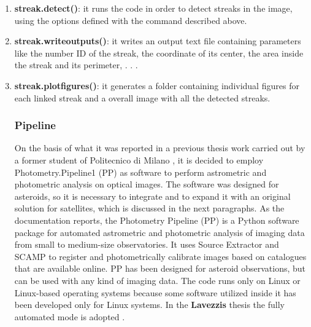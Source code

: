 \documentclass[11pt]{article}
\begin{document}
\begin{enumerate}
\begin{enumerate}
value of these distances). For a circle, that value is zero.
\item \textbf{connectivity\textunderscore angle}: the maximum angle of slope to link each streak; if
two or more streaks have their slopes within the \textbf{connectivity\textunderscore angle} and
also the slope between the centers of the streaks is within it, \textbf{ASTRiDE}
determines that these streaks are connected.
\item \textbf{output\textunderscore path}: output path to save figures and outputs.
\end{enumerate}{}
\item \textbf{streak.detect()}: it runs the code in order to detect streaks in the image,
using the options defined with the command described above.
\item \textbf{streak.write\textunderscore outputs()}: it writes an output text file containing parameters
like the number ID of the streak, the coordinate of its center, the area
inside the streak and its perimeter, . . .
\item \textbf{streak.plot\textunderscore figures()}: it generates a folder containing individual figures
for each linked streak  and a overall image with all the detected
streaks.
\subsubsection{Pipeline}
On the basis of what it was reported in a previous thesis  work carried out by a
former student of Politecnico di Milano , it is decided to employ Photometry.Pipeline1 (PP) as software to perform astrometric and photometric analysis on
optical images. The software was designed for asteroids, so it is necessary to
integrate and to expand it with an original solution for satellites, which is discussed
in the next paragraphs.
As the documentation reports, the Photometry Pipeline (PP) is a Python software
package for automated astrometric and photometric analysis of imaging data
from small to medium-size observatories. It uses Source Extractor and SCAMP to
register and photometrically calibrate images based on catalogues that are available
online. PP has been designed for asteroid observations, but can be used with
any kind of imaging data. The code runs only on Linux or Linux-based operating
systems because some software utilized inside it has been developed only for Linux
systems. In the \textbf{Lavezzi\textquotesingle s }thesis the fully automated mode is adopted \cite{lavezzi}.

\end{enumerate}
\end{document}
